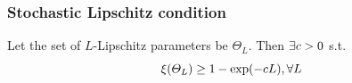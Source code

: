 \begin{frame}
  \frametitle{Stochastic Lipschitz condition}
  \begin{assumption}
    Let the set of $L$-Lipschitz parameters be $\Theta_L$.
    Then $\exists c  > 0$ s.t. 
    \begin{equation}
      \xi(\Theta_L) \geq 1 -  \exp(-cL), \forall L
    \end{equation}
    \label{ass:hoelder-measure-observations}
  \end{assumption}
\end{frame}

